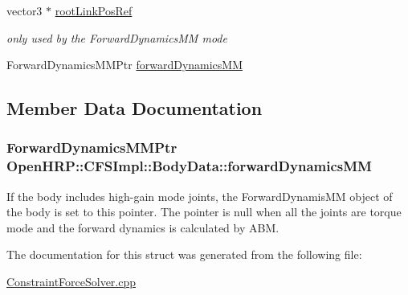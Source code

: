 \begin{DoxyCompactItemize}
\item 
\hypertarget{structOpenHRP_1_1CFSImpl_1_1BodyData_ad367b651a9335667c4632443f395e48a}{vector3 $\ast$ \hyperlink{structOpenHRP_1_1CFSImpl_1_1BodyData_ad367b651a9335667c4632443f395e48a}{root\-Link\-Pos\-Ref}}\label{structOpenHRP_1_1CFSImpl_1_1BodyData_ad367b651a9335667c4632443f395e48a}

\begin{DoxyCompactList}\small\item\em only used by the Forward\-Dynamics\-M\-M mode \end{DoxyCompactList}\item 
Forward\-Dynamics\-M\-M\-Ptr \hyperlink{structOpenHRP_1_1CFSImpl_1_1BodyData_a8077fb9ac98541e9bf183b090f624f60}{forward\-Dynamics\-M\-M}
\end{DoxyCompactItemize}


\subsection{Member Data Documentation}
\hypertarget{structOpenHRP_1_1CFSImpl_1_1BodyData_a8077fb9ac98541e9bf183b090f624f60}{
\subsubsection[{forward\-Dynamics\-M\-M}]{\setlength{\rightskip}{0pt plus 5cm}Forward\-Dynamics\-M\-M\-Ptr Open\-H\-R\-P\-::\-C\-F\-S\-Impl\-::\-Body\-Data\-::forward\-Dynamics\-M\-M}}\label{structOpenHRP_1_1CFSImpl_1_1BodyData_a8077fb9ac98541e9bf183b090f624f60}
If the body includes high-\/gain mode joints, the Forward\-Dynamis\-M\-M object of the body is set to this pointer. The pointer is null when all the joints are torque mode and the forward dynamics is calculated by A\-B\-M. 

The documentation for this struct was generated from the following file\-:\begin{DoxyCompactItemize}
\item 
\hyperlink{ConstraintForceSolver_8cpp}{Constraint\-Force\-Solver.\-cpp}\end{DoxyCompactItemize}
